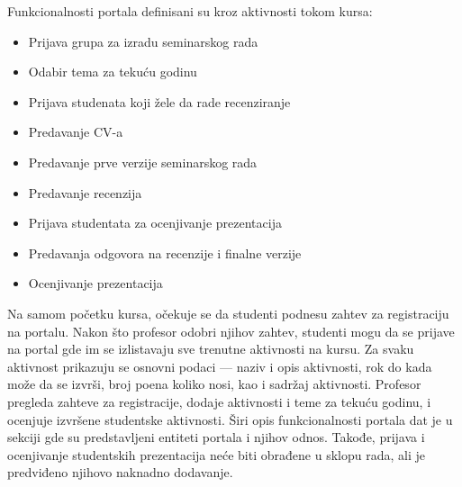 \documentclass[12pt,oneside]{memoir}
\begin{document}
Funkcionalnosti portala definisani su kroz aktivnosti tokom kursa:
\begin{itemize}
  \item Prijava grupa za izradu seminarskog rada
  \item Odabir tema za tekuću godinu
  \item Prijava studenata koji žele da rade recenziranje
  \item Predavanje CV-a
  \item Predavanje prve verzije seminarskog rada
  \item Predavanje recenzija
  \item Prijava studentata za ocenjivanje prezentacija
  \item Predavanja odgovora na recenzije i finalne verzije
  \item Ocenjivanje prezentacija 
\end{itemize}


Na samom početku kursa, očekuje se da studenti podnesu zahtev za registraciju na portalu. Nakon što profesor odobri njihov zahtev,
studenti mogu da se prijave na portal gde im se izlistavaju sve trenutne aktivnosti na kursu. Za svaku aktivnost prikazuju se osnovni
podaci --- naziv i opis aktivnosti, rok do kada može da se izvrši, broj poena koliko nosi, kao i sadržaj aktivnosti. Profesor pregleda
zahteve za registracije, dodaje aktivnosti i teme za tekuću godinu, i ocenjuje izvršene studentske aktivnosti.
Širi opis funkcionalnosti portala dat je u sekciji gde su predstavljeni entiteti portala i njihov odnos. Takođe, prijava i ocenjivanje
studentskih prezentacija neće biti obrađene u sklopu rada, ali je predviđeno njihovo naknadno dodavanje.
\end{document}
